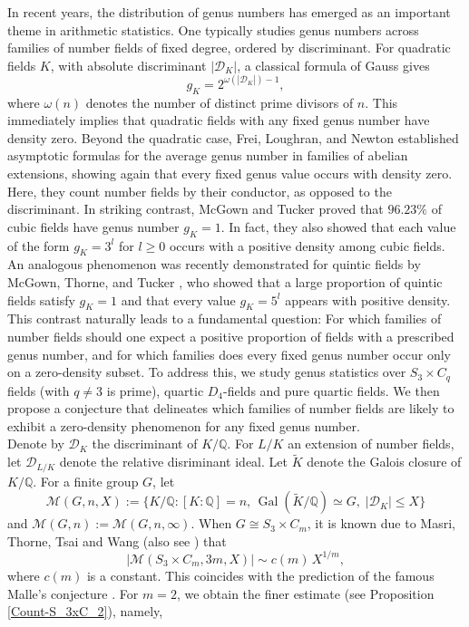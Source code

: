 \documentclass[11pt,reqno]{amsart}
\newcommand{\Q}{\mathbb{Q}}
\newcommand{\cD}{\mathcal{D}}
\newcommand{\cM}{\mathcal{M}}
\theoremstyle{definition}
\theoremstyle{remark}
\begin{document}
In recent years, the distribution of genus numbers has emerged as an important theme in arithmetic statistics. One typically studies genus numbers across families of number fields of fixed degree, ordered by discriminant. For quadratic fields $K$, with absolute discriminant $|\cD_K|$, a classical formula of Gauss gives
\begin{equation*}
    g_K = 2^{\omega(|\cD_K|)-1},
\end{equation*}
where $\omega(n)$ denotes the number of distinct prime divisors of $n$. This immediately implies that quadratic fields with any fixed genus number have density zero. Beyond the quadratic case, Frei, Loughran, and Newton \cite{FDR23} established asymptotic formulas for the average genus number in families of abelian extensions, showing again that every fixed genus value occurs with density zero. Here, they count number fields by their conductor, as opposed to the discriminant. In striking contrast, McGown and Tucker \cite{cubicwithgenusnumber1} proved that $96.23\%$ of cubic fields have genus number $g_K=1$. In fact, they also showed that each value of the form $g_K=3^l$ for $l\geq 0$ occurs with a positive density among cubic fields. An analogous phenomenon was recently demonstrated for quintic fields by McGown, Thorne, and Tucker \cite{MTT23}, who showed that a large proportion of quintic fields satisfy $g_K=1$ and that every value $g_K = 5^l$ appears with positive density. \\

This contrast naturally leads to a fundamental question: For which families of number fields should one expect a positive proportion of fields with a prescribed genus number, and for which families does every fixed genus number occur only on a zero-density subset. To address this, we study genus statistics over $S_3\times C_q$ fields (with $q\neq 3$ is prime), quartic $D_4$-fields and pure quartic fields. We then propose a conjecture that delineates which families of number fields are likely to exhibit a zero-density phenomenon for any fixed genus number.\\

Denote by $\cD_K$ the discriminant of $K/\Q$. For $L/K$ an extension of number fields, let $\cD_{L/K}$ denote the relative disriminant ideal. Let $\widetilde{K}$ denote the Galois closure of $K/\Q$. For a finite group $G$, let
\begin{equation*}
    \cM(G, n,X):=\{K/\mathbb{Q} : [K:\Q]=n,\, \operatorname{Gal}(\widetilde{K}/\mathbb{Q})\simeq G,\; |\cD_K|\le X\}
\end{equation*}
and $\cM(G,n):= \cM(G,n, \infty)$. When $G\cong S_3\times C_m$, it is known due to Masri, Thorne, Tsai and Wang \cite{MasriThorneTsaiWang2020} (also see \cite{wang21}) that
\begin{equation*}
    |\cM(S_3\times C_m, 3m, X)| \sim c(m)\, X^{1/m},
\end{equation*}
where $c(m)$ is a constant. This coincides with the prediction of the famous Malle's conjecture \cite{Mal04}. For $m=2$, we obtain the finer estimate (see Proposition \ref{Count-S_3xC_2}), namely,
\end{document}
